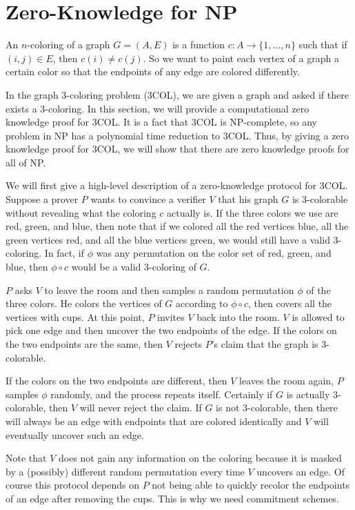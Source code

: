 
\section{Zero-Knowledge for NP}

An $n$-coloring of a graph $G = (A, E)$ is a function $c: A \to \{1, \ldots, n \}$ such that if $(i, j) \in E$, then $c(i) \neq c(j)$. So we want to paint each vertex of a graph a certain color so that the endpoints of any edge are colored differently.

In the graph 3-coloring problem (3COL), we are given a graph and asked if there exists a 3-coloring. In this section, we will provide a computational zero knowledge proof for 3COL. It is a fact that 3COL is NP-complete, so any problem in NP has a polynomial time reduction to 3COL. Thus, by giving a zero knowledge proof for 3COL, we will show that there are zero knowledge proofs for all of NP.

We will first give a high-level description of a zero-knowledge protocol for 3COL. Suppose a prover $P$ wants to convince a verifier $V$ that his graph $G$ is 3-colorable without revealing what the coloring $c$ actually is. If the three colors we use are red, green, and blue, then note that if we colored all the red vertices blue, all the green vertices red, and all the blue vertices green, we would still have a valid 3-coloring. In fact, if $\phi$ was any permutation on the color set of red, green, and blue, then $\phi \circ c$ would be a valid 3-coloring of $G$.

$P$ asks $V$ to leave the room and then samples a random permutation $\phi$ of the three colors. He colors the vertices of $G$ according to $\phi \circ c$, then covers all the vertices with cups. At this point, $P$ invites $V$ back into the room. $V$ is allowed to pick one edge and then uncover the two endpoints of the edge. If the colors on the two endpoints are the same, then $V$ rejects $P$'s claim that the graph is 3-colorable.

If the colors on the two endpoints are different, then $V$ leaves the room again, $P$ samples $\phi$ randomly, and the process repeats itself. Certainly if $G$ is actually 3-colorable, then $V$ will never reject the claim. If $G$ is not 3-colorable, then there will always be an edge with endpoints that are colored identically and $V$ will eventually uncover such an edge.

Note that $V$ does not gain any information on the coloring because it is masked by a (possibly) different random permutation every time $V$ uncovers an edge. Of course this protocol depends on $P$ not being able to quickly recolor the endpoints of an edge after removing the cups. This is why we need commitment schemes.

